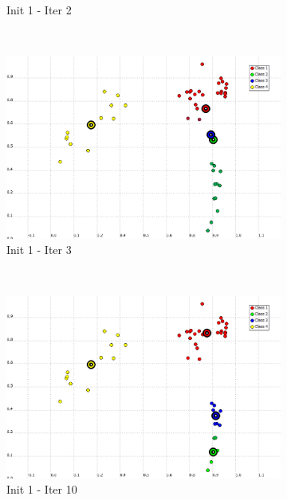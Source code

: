 \documentclass[a4paper,10pt]{article}
\begin{document}
\begin{figure}[H]
\begin{subfigure}[t]{0.2\textwidth}
      \caption{Init 1 - Iter 2}
      \label{fig:K-Means-4K-beta-30-it2}
     \end{subfigure}
      ~
    \begin{subfigure}[t]{0.2\textwidth}
      \centering
      \includegraphics[width=\textwidth]{pictures/K-Means-4K-beta-30-it3.png}
      \caption{Init 1 - Iter 3}
      \label{fig:K-Means-4K-beta-30-it3}
     \end{subfigure}
      ~
    \begin{subfigure}[t]{0.2\textwidth}
      \centering
      \includegraphics[width=\textwidth]{pictures/K-Means-4K-beta-30-it10.png}
      \caption{Init 1 - Iter 10}
      \label{fig:K-Means-4K-beta-30-it10}
     \end{subfigure}
     ~
     \begin{subfigure}[t]{0.2\textwidth}
      \centering

\end{subfigure}
\end{figure}
\end{document}
